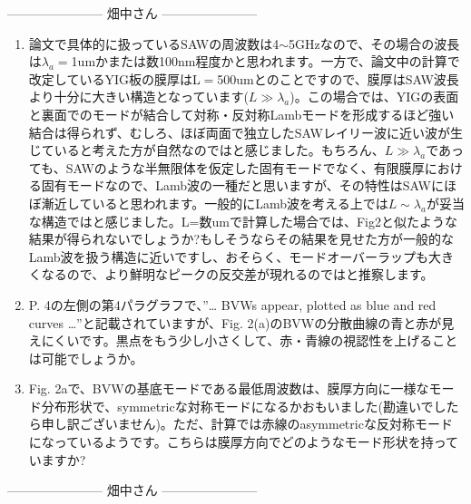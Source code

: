 \documentclass{jsarticle}
\begin{document}
-----------------------
畑中さん
-----------------------
\begin{enumerate}
    \item  論文で具体的に扱っているSAWの周波数は4$\sim$5GHzなので、その場合の波長は$\lambda_a=$1umかまたは数100nm程度かと思われます。一方で、論文中の計算で改定しているYIG板の膜厚はL$=$500umとのことですので、膜厚はSAW波長より十分に大きい構造となっています($L\gg\lambda_a$)。この場合では、YIGの表面と裏面でのモードが結合して対称・反対称Lambモードを形成するほど強い結合は得られず、むしろ、ほぼ両面で独立したSAWレイリー波に近い波が生じていると考えた方が自然なのではと感じました。もちろん、$L\gg\lambda_a$であっても、SAWのような半無限体を仮定した固有モードでなく、有限膜厚における固有モードなので、Lamb波の一種だと思いますが、その特性はSAWにほぼ漸近していると思われます。一般的にLamb波を考える上では$L\sim\lambda_a$が妥当な構造ではと感じました。L=数umで計算した場合では、Fig2と似たような結果が得られないでしょうか?もしそうならその結果を見せた方が一般的なLamb波を扱う構造に近いですし、おそらく、モードオーバーラップも大きくなるので、より鮮明なピークの反交差が現れるのではと推察します。
    \item P. 4の左側の第4パラグラフで、”… BVWs appear, plotted as blue and red curves …”と記載されていますが、Fig. 2(a)のBVWの分散曲線の青と赤が見えにくいです。黒点をもう少し小さくして、赤・青線の視認性を上げることは可能でしょうか。
    \item Fig. 2aで、BVWの基底モードである最低周波数は、膜厚方向に一様なモード分布形状で、symmetricな対称モードになるかおもいました(勘違いでしたら申し訳ございません)。ただ、計算では赤線のasymmetricな反対称モードになっているようです。こちらは膜厚方向でどのようなモード形状を持っていますか?
\end{enumerate}
-----------------------
畑中さん
-----------------------
\end{document}
